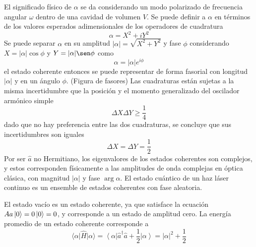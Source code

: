 El significado físico de $\alpha$ se da considerando un modo polarizado de frecuencia angular $\omega$ dentro de una cavidad de volumen $V$. Se puede definir a $\alpha$ en términos de los valores esperados adimensionales de los operadores de cuadratura
\begin{equation*}
  \alpha = X^2 + iY^2
\end{equation*}
Se puede separar $\alpha$ en su amplitud $|\alpha|=\sqrt{X^2 + Y^2}$ y fase $\phi$ considerando $X = |\alpha|\cos\phi$ y $Y=|\alpha|\sen\phi$ como
\begin{equation*}
  \alpha = |\alpha|e^{i\phi}
\end{equation*}
el estado coherente entonces se puede representar de forma fasorial con longitud $|\alpha|$ y en un ángulo $\phi$.
(Figura de fasores)
Las cuadraturas están sujetas a la misma incertidumbre que la posición y el momento generalizado del oscilador armónico simple
\begin{equation*}
  \Delta X \Delta Y \geq \frac{1}{4}
\end{equation*}
dado que no hay preferencia entre las dos cuadraturas, se concluye que sus incertidumbres son iguales
\begin{equation*}
  \Delta X = \Delta Y = \frac{1}{2}
\end{equation*}
Por ser $\hat{a}$ no Hermitiano, los eigenvalores de los estados coherentes son complejos, y estos corresponden físicamente a las amplitudes de onda complejas en óptica clásica, con magnitud $|\alpha|$ y fase $\arg \alpha$. El estado cuántico de un haz láser continuo es un ensemble de estados coherentes con fase aleatoria.

El estado vacío es un estado coherente, ya que satisface la ecuación $A{a} \ket{0} = 0 \ket{0} = 0$, y corresponde a un estado de amplitud cero. La energía promedio de un estado coherente corresponde a
\begin{equation*}
  \langle \alpha \vert \hat{H}\vert \alpha \rangle = \left\langle \alpha \right\vert \hat{a}^{\dagger}\hat{a} + \frac{1}{2} \left\vert \alpha \right\rangle = |\alpha|^2 + \frac{1}{2}
\end{equation*}

